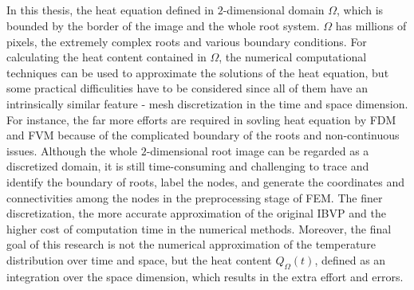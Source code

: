 \subsection{}



In this thesis, the heat equation defined in $2$-dimensional domain
$\Omega$, which is bounded by the border of the image and the whole
root system. $\Omega$ has millions of pixels, the extremely complex
roots and various boundary conditions. For calculating the heat
content contained in $\Omega$, the numerical computational techniques
can be used to approximate the solutions of the heat equation, but
some practical difficulities have to be considered since all of them
have an intrinsically similar feature - mesh discretization in the
time and space dimension. For instance, the far more efforts are
required in sovling heat equation by FDM and FVM because of the
complicated boundary of the roots and non-continuous issues. Although
the whole $2$-dimensional root image can be regarded as a discretized
domain, it is still time-consuming and challenging to trace and
identify the boundary of roots, label the nodes, and generate the
coordinates and connectivities among the nodes in the preprocessing
stage of FEM. The finer discretization, the more accurate
approximation of the original IBVP and the higher cost of computation
time in the numerical methods. Moreover, the final goal of this
research is not the numerical approximation of the temperature
distribution over time and space, but the heat content
$Q_{\Omega}(t)$, defined as an integration over the space dimension,
which results in the extra effort and errors.
